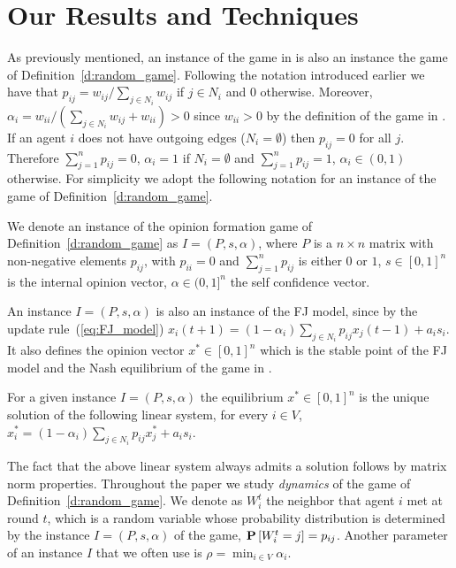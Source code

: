 \section{Our Results and Techniques}\label{s:results}
As previously mentioned, an instance of the game in \cite{BKO11}
is also an instance the game of Definition~\ref{d:random_game}.
Following the notation introduced earlier we have that
$p_{ij} = w_{ij}/\sum_{j \in N_i}w_{ij}$ if $j \in N_i$ and $0$ otherwise.
Moreover, $\alpha_i=w_{ii}/(\sum_{j \in N_i}w_{ij}+w_{ii})>0$ since $w_{ii}>0$
by the definition of the game in \cite{BKO11}.
If an agent $i$ does not have outgoing edges ($N_i = \emptyset$) then
$p_{ij} = 0$ for all $j$. Therefore $\sum_{j=1}^n p_{ij}=0$, $\alpha_i=1$ if $N_i= \emptyset$
and $\sum_{j=1}^n p_{ij}=1$, $\alpha_i \in (0,1)$ otherwise.
For simplicity we adopt the following notation for
an instance of the game of Definition~\ref{d:random_game}.
%
\begin{definition}\label{d:instance}
  We denote an instance of the opinion formation game of Definition~\ref{d:random_game}
  as $I=(P,s,\alpha)$, where
    $P$ is a $n \times n$  matrix with non-negative elements $p_{ij}$,
      with $p_{ii}=0$ and $\sum_{j=1}^n p_{ij}$ is either $0$ or $1$,
    $s \in [0,1]^n$ is the internal opinion vector,
    $\alpha \in (0,1]^n$ the self confidence vector.
\end{definition}
%

An instance $I=(P,s,\alpha)$ is also an instance
of the FJ model, since by the update rule~(\ref{eq:FJ_model})
$x_i(t+1)=(1-\alpha_i)\sum_{j \in N_i}p_{ij}x_j(t-1) + a_i s_i$.
It also defines the opinion vector $x^* \in [0,1]^n$ which is the
stable point of the FJ model and the Nash equilibrium
of the game in \cite{BKO11}.
\begin{definition}
For a given instance $I=(P,s,\alpha)$ the equilibrium
$x^*\in [0,1]^n$ is the unique solution of the following linear system,
for every $i \in V$, $x^*_i=(1-\alpha_i)\sum_{j \in N_i}p_{ij}x_j^* + a_i s_i$.
\end{definition}
The fact that the above linear system always admits a solution follows
by matrix norm properties.
Throughout the paper we study \emph{dynamics} of the game of
Definition~\ref{d:random_game}.  We denote as $W_i^t$ the neighbor that agent $i$
met at round $t$, which is a random variable whose probability distribution is
determined by the instance $I=(P,s,\alpha)$ of the game, $\bm{\mathrm{P}}\left[W_i^t=j\right]=p_{ij}$.
Another parameter of an instance $I$ that we often use is
$\rho=\min_{i \in V}\alpha_i$.

